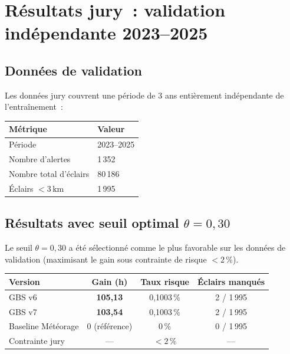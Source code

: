 \documentclass[a4paper,11pt]{article}
\begin{document}
\section{Résultats jury~: validation indépendante 2023--2025}

\subsection{Données de validation}

Les données jury couvrent une période de 3 ans entièrement indépendante de l'entraînement~:

\begin{center}
\begin{tabular}{ll}
\toprule
\textbf{Métrique} & \textbf{Valeur} \\
\midrule
Période & 2023--2025 \\
Nombre d'alertes & 1\,352 \\
Nombre total d'éclairs & 80\,186 \\
Éclairs $< 3\,\text{km}$ & 1\,995 \\
\bottomrule
\end{tabular}
\end{center}

\subsection{Résultats avec seuil optimal $\theta = 0{,}30$}

Le seuil $\theta = 0{,}30$ a été sélectionné comme le plus favorable sur les données de
validation (maximisant le gain sous contrainte de risque $< 2\,\%$).

\begin{tcolorbox}[resultstyle, title={Résultats jury -- GBS v6 et v7 ($\theta = 0{,}30$)}]
\begin{center}
\begin{tabular}{lccc}
\toprule
\textbf{Version} & \textbf{Gain (h)} & \textbf{Taux risque} & \textbf{Éclairs manqués} \\
\midrule
GBS v6 & \textbf{105,13} & 0,1003\,\% & 2 / 1\,995 \\
GBS v7 & \textbf{103,54} & 0,1003\,\% & 2 / 1\,995 \\
\midrule
Baseline Météorage & 0 (référence) & 0\,\% & 0 / 1\,995 \\
\midrule
Contrainte jury & --- & $< 2\,\%$ & --- \\
\bottomrule
\end{tabular}
\end{center}
\end{tcolorbox}
\end{document}
